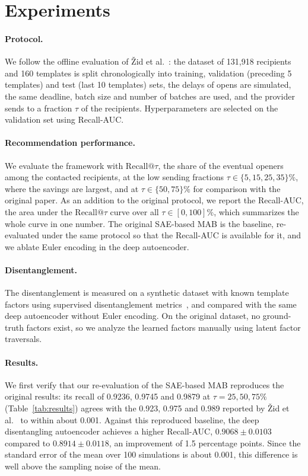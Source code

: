 \documentclass[sigconf]{acmart}
\begin{document}
\section{Experiments}

\paragraph{Protocol.} We follow the offline evaluation of \v{Z}id et
al.~\cite{zid2025active}: the dataset of 131,918 recipients and 160 templates is
split chronologically into training, validation (preceding 5 templates) and test
(last 10 templates) sets, the delays of opens are simulated, the same deadline,
batch size and number of batches are used, and the provider sends to a fraction
$\tau$ of the recipients. Hyperparameters are selected on the validation set using Recall-AUC.

\paragraph{Recommendation performance.} We evaluate the framework with
$\mathrm{Recall}@\tau$, the share of the eventual openers among the contacted
recipients, at the low sending fractions $\tau \in \{5, 15, 25, 35\}\%$, where
the savings are largest, and at $\tau \in \{50, 75\}\%$ for comparison with the
original paper. As an addition to the original protocol, we report the
Recall-AUC, the area under the $\mathrm{Recall}@\tau$ curve over all
$\tau \in [0, 100]\%$, which summarizes the whole curve in one number. The
original SAE-based MAB is the baseline, re-evaluated under the same protocol so
that the Recall-AUC is available for it, and we ablate Euler encoding in the
deep autoencoder.

\paragraph{Disentanglement.} The disentanglement is measured on a synthetic
dataset with known template factors using supervised disentanglement
metrics~\cite{carbonneau2022measuring}, and compared with the same deep
autoencoder without Euler encoding. On the original dataset, no ground-truth
factors exist, so we analyze the learned factors manually using latent factor
traversals.

\paragraph{Results.} We first verify that our re-evaluation of the SAE-based MAB
reproduces the original results: its recall of 0.9236, 0.9745 and 0.9879 at
$\tau = 25, 50, 75\%$ (Table~\ref{tab:results}) agrees with the 0.923, 0.975 and
0.989 reported by \v{Z}id et al.~\cite{zid2025active} to within about 0.001.
Against this reproduced baseline, the deep disentangling autoencoder achieves a
higher Recall-AUC, $0.9068 \pm 0.0103$ compared to $0.8914 \pm 0.0118$, an
improvement of 1.5 percentage points. Since the standard error of the mean over
100 simulations is about 0.001, this difference is well above the sampling
noise of the mean.
\end{document}
